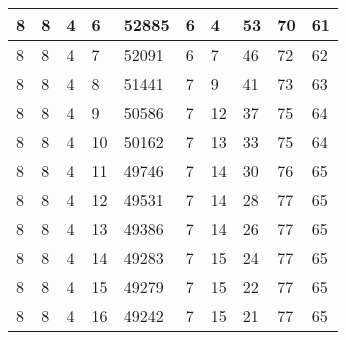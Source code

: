 \begin{table}[!ht]
\begin{tabular}{|l|l|l|l|l|l|l|l|l|l|}
        8 & 8 & 4 & 6 & 52885 & 6 & 4 & 53 & 70 & 61 \\ \hline
        8 & 8 & 4 & 7 & 52091 & 6 & 7 & 46 & 72 & 62 \\ \hline
        8 & 8 & 4 & 8 & 51441 & 7 & 9 & 41 & 73 & 63 \\ \hline
        8 & 8 & 4 & 9 & 50586 & 7 & 12 & 37 & 75 & 64 \\ \hline
        8 & 8 & 4 & 10 & 50162 & 7 & 13 & 33 & 75 & 64 \\ \hline
        8 & 8 & 4 & 11 & 49746 & 7 & 14 & 30 & 76 & 65 \\ \hline
        8 & 8 & 4 & 12 & 49531 & 7 & 14 & 28 & 77 & 65 \\ \hline
        8 & 8 & 4 & 13 & 49386 & 7 & 14 & 26 & 77 & 65 \\ \hline
        8 & 8 & 4 & 14 & 49283 & 7 & 15 & 24 & 77 & 65 \\ \hline
        8 & 8 & 4 & 15 & 49279 & 7 & 15 & 22 & 77 & 65 \\ \hline
        8 & 8 & 4 & 16 & 49242 & 7 & 15 & 21 & 77 & 65 \\ \hline
    \end{tabular}
\end{table}